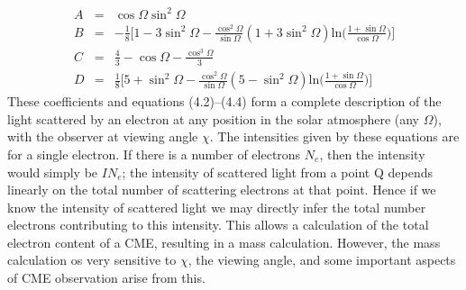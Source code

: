 \begin{eqnarray}
A &=& \cos \Omega \sin^2 \Omega \\
%
B &=& -\frac{1}{8}\bigg[1 - 3\sin^2\Omega -\frac{\cos^2\Omega}{\sin\Omega}(1+3\sin^2\Omega)\textrm{ln}\bigg(\frac{1+\sin\Omega}{\cos\Omega}\bigg)\bigg] \\
%
C &=& \frac{4}{3} - \cos\Omega - \frac{\cos^3\Omega}{3} \\
%
D &=& \frac{1}{8}\bigg[5 + \sin^2\Omega -\frac{\cos^2\Omega}{\sin\Omega}(5-\sin^2\Omega)\textrm{ln}\bigg(\frac{1+\sin\Omega}{\cos\Omega}\bigg)\bigg] 
\end{eqnarray}
These coefficients and equations (4.2)--(4.4) form a complete description of the light scattered by an electron at any position in the solar atmosphere (any $\Omega$), with the observer at viewing angle $\chi$. The intensities given by these equations are for a single electron. If there is a number of electrons $N_e$, then the intensity would simply be $IN_e$; the intensity of scattered light from a point Q depends linearly on the total number of scattering electrons at that point. Hence if we know the intensity of scattered light we may directly infer the total number electrons contributing to this intensity. This allows a calculation of the total electron content of a CME, resulting in a mass calculation. However, the mass calculation os very sensitive to $\chi$, the viewing angle, and some important aspects of CME observation arise from this.


